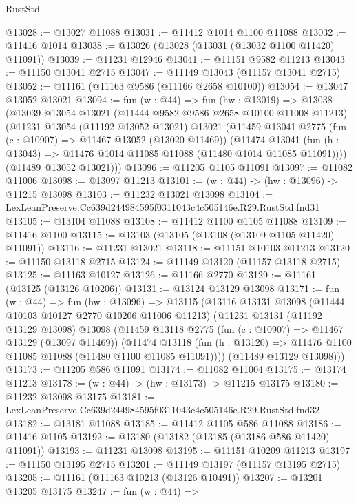 \begin{lexlean}{RustStd}
\begin{coremodule}
@13028 := @13027 @11088
@13031 := @11412 @1014 @1100 @11088
@13032 := @11416 @1014
@13038 := @13026 (@13028 (@13031 (@13032 @1100 @11420) @11091))
@13039 := @11231 @12946
@13041 := @11151 @9582 @11213
@13043 := @11150 @13041 @2715
@13047 := @11149 @13043 (@11157 @13041 @2715)
@13052 := @11161 (@11163 @9586 (@11166 @2658 @10100))
@13054 := @13047 @13052 @13021
@13094 := fun (w : @44) =>
  fun (hw : @13019) =>
  @13038
    (@13039
      @13054
      @13021
      (@11444 @9582 @9586 @2658 @10100 @11008 @11213)
      (@11231
        @13054
        (@11192 @13052 @13021)
        @13021
        (@11459
          @13041
          @2775
          (fun (c : @10907) => @11467 @13052 (@13020 @11469))
          (@11474
            @13041
            (fun (h : @13043) => @11476 @1014 @11085 @11088 (@11480 @1014 @11085 @11091))))
        (@11489 @13052 @13021)))
@13096 := @11205 @1105 @11091
@13097 := @11082 @11006
@13098 := @13097 @11213
@13101 := (w : @44) -> (hw : @13096) -> @11215 @13098
@13103 := @11232 @13021 @13098
@13104 := LexLeanPreserve.Cc639d244984595f0311043c4c505146e.R29.RustStd.fnd31
@13105 := @13104 @11088
@13108 := @11412 @1100 @1105 @11088
@13109 := @11416 @1100
@13115 := @13103 (@13105 (@13108 (@13109 @1105 @11420) @11091))
@13116 := @11231 @13021
@13118 := @11151 @10103 @11213
@13120 := @11150 @13118 @2715
@13124 := @11149 @13120 (@11157 @13118 @2715)
@13125 := @11163 @10127
@13126 := @11166 @2770
@13129 := @11161 (@13125 (@13126 @10206))
@13131 := @13124 @13129 @13098
@13171 := fun (w : @44) =>
  fun (hw : @13096) =>
  @13115
    (@13116
      @13131
      @13098
      (@11444 @10103 @10127 @2770 @10206 @11006 @11213)
      (@11231
        @13131
        (@11192 @13129 @13098)
        @13098
        (@11459
          @13118
          @2775
          (fun (c : @10907) => @11467 @13129 (@13097 @11469))
          (@11474
            @13118
            (fun (h : @13120) => @11476 @1100 @11085 @11088 (@11480 @1100 @11085 @11091))))
        (@11489 @13129 @13098)))
@13173 := @11205 @586 @11091
@13174 := @11082 @11004
@13175 := @13174 @11213
@13178 := (w : @44) -> (hw : @13173) -> @11215 @13175
@13180 := @11232 @13098 @13175
@13181 := LexLeanPreserve.Cc639d244984595f0311043c4c505146e.R29.RustStd.fnd32
@13182 := @13181 @11088
@13185 := @11412 @1105 @586 @11088
@13186 := @11416 @1105
@13192 := @13180 (@13182 (@13185 (@13186 @586 @11420) @11091))
@13193 := @11231 @13098
@13195 := @11151 @10209 @11213
@13197 := @11150 @13195 @2715
@13201 := @11149 @13197 (@11157 @13195 @2715)
@13205 := @11161 (@11163 @10213 (@13126 @10491))
@13207 := @13201 @13205 @13175
@13247 := fun (w : @44) =>

\end{coremodule}
\end{lexlean}

